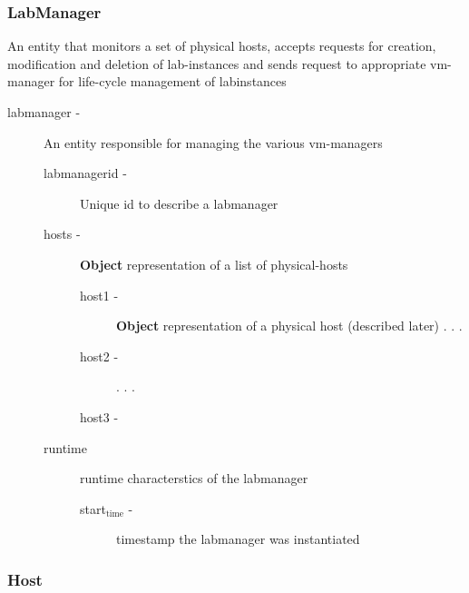 \documentclass[11pt]{article}
\begin{document}
\subsubsection{LabManager}
\label{sec-3.3.3}


     An entity that monitors a set of physical hosts, accepts requests for
     creation, modification and deletion of lab-instances and sends
     request to appropriate vm-manager for life-cycle management of
     labinstances

\begin{description}
\item [labmanager -] An entity responsible for managing the various vm-managers

\begin{description}
\item [labmanagerid -] Unique id to describe a labmanager
\item [hosts -] \textbf{Object} representation of a list of physical-hosts

\begin{description}
\item [host1 -] \textbf{Object} representation of a physical host (described later)
            .
            .
            .
\item [host2 -]
            .
            .
            .
\item [host3 -]
\end{description}

\item [runtime] runtime characterstics of the labmanager

\begin{description}
\item [start$_{\mathrm{time}}$ -] timestamp the labmanager was instantiated
\end{description}

\end{description}

\end{description}
\subsubsection{Host}
\label{sec-3.3.4}
\end{document}
